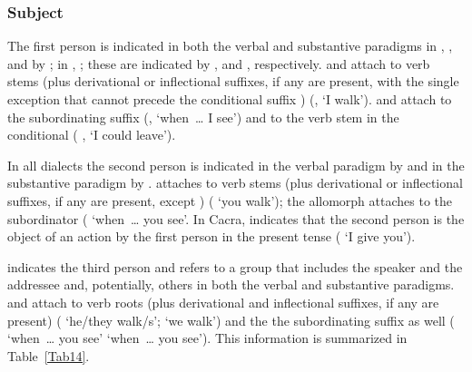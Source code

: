 \subsubsection{Subject}\label{ssec:subjallo}
The first person is indicated in both the verbal and substantive paradigms in \ACH, \CH, and \SP{} by \phono{-:}\tss{\ACH,\CH,\SP}; in \AMV, \LT; these are indicated by \tss{\AMV,\LT}, and \tss{\AMV,\LT}, respectively. \phono{-:} and  attach to verb stems (plus derivational or inflectional suffixes, if any are present, with the single exception that  cannot precede the conditional suffix ) (,  ‘I walk’). \phono{-:} and  attach to the subordinating suffix  (,  ‘when~\dots{} I see’) and to the verb stem in the conditional ( ,  ‘I could leave’).

In all dialects the second person is indicated in the verbal paradigm by  and in the substantive paradigm by .  attaches to verb stems (plus derivational or inflectional suffixes, if any are present, except ) ( ‘you walk’); the  allomorph  attaches to the subordinator  ( ‘when~\dots{} you see’. In Cacra,  indicates that the second person is the object of an action by the first person in the present tense ( ‘I give you’).

 indicates the third person and  refers to a group that includes the speaker and the addressee and, potentially, others in both the verbal and substantive paradigms.  and  attach to verb roots (plus derivational and inflectional suffixes, if any are present) ( ‘he/they walk/s’;  ‘we walk’) and the the subordinating suffix  as well ( ‘when~\dots{} you see’  ‘when~\dots{} you see’). This information is summarized in Table~\ref{Tab14}.

